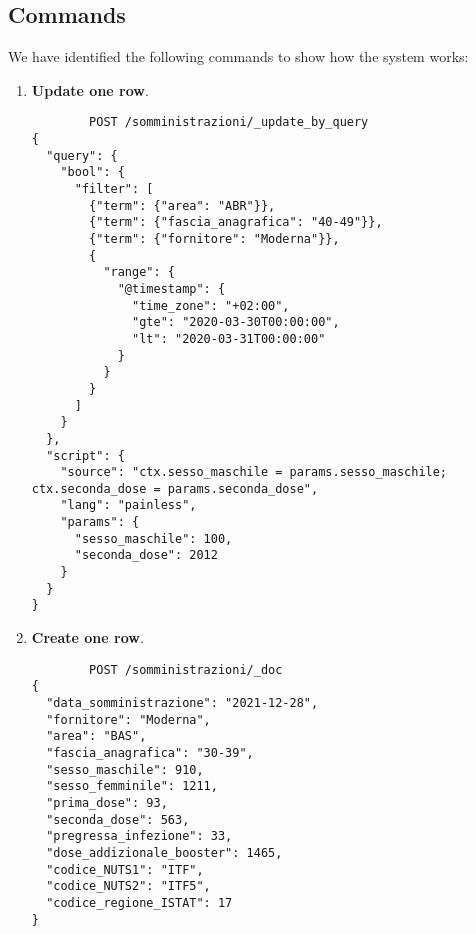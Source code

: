 \documentclass{article}
\begin{document}
\subsection{Commands}
We have identified the following commands to show how the system works:\\
\begin{enumerate}
    \item \textbf{Update one row}.\\
   
\begin{lstlisting}
        POST /somministrazioni/_update_by_query
{
  "query": {
    "bool": {
      "filter": [
        {"term": {"area": "ABR"}},
        {"term": {"fascia_anagrafica": "40-49"}},
        {"term": {"fornitore": "Moderna"}},
        {
          "range": {
            "@timestamp": {
              "time_zone": "+02:00",
              "gte": "2020-03-30T00:00:00",
              "lt": "2020-03-31T00:00:00"
            }
          }
        }
      ]
    }
  },
  "script": {
    "source": "ctx.sesso_maschile = params.sesso_maschile; ctx.seconda_dose = params.seconda_dose",
    "lang": "painless",
    "params": {
      "sesso_maschile": 100,
      "seconda_dose": 2012
    }
  }
}
\end{lstlisting}
\item \textbf{Create one row}.\\
\begin{lstlisting}
        POST /somministrazioni/_doc
{
  "data_somministrazione": "2021-12-28",
  "fornitore": "Moderna",
  "area": "BAS",
  "fascia_anagrafica": "30-39",
  "sesso_maschile": 910,
  "sesso_femminile": 1211,
  "prima_dose": 93,
  "seconda_dose": 563,
  "pregressa_infezione": 33,
  "dose_addizionale_booster": 1465,
  "codice_NUTS1": "ITF",
  "codice_NUTS2": "ITF5",
  "codice_regione_ISTAT": 17
}
\end{lstlisting}
\end{enumerate}
\end{document}
